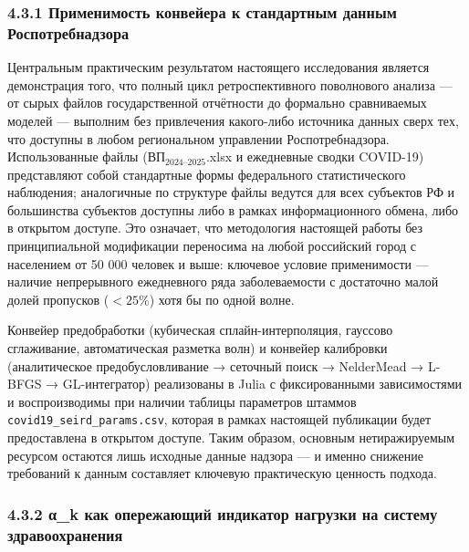 \documentclass[12pt]{article}
\begin{document}
\subsubsection{4.3.1 Применимость конвейера к стандартным данным
Роспотребнадзора}\label{ux43fux440ux438ux43cux435ux43dux438ux43cux43eux441ux442ux44c-ux43aux43eux43dux432ux435ux439ux435ux440ux430-ux43a-ux441ux442ux430ux43dux434ux430ux440ux442ux43dux44bux43c-ux434ux430ux43dux43dux44bux43c-ux440ux43eux441ux43fux43eux442ux440ux435ux431ux43dux430ux434ux437ux43eux440ux430}

Центральным практическим результатом настоящего исследования является
демонстрация того, что полный цикл ретроспективного поволнового анализа
--- от сырых файлов государственной отчётности до формально сравниваемых
моделей --- выполним без привлечения какого-либо источника данных сверх
тех, что доступны в любом региональном управлении Роспотребнадзора.
Использованные файлы (\(\text{ВП}_{2024\text{–}2025}\).xlsx и ежедневные
сводки COVID-19) представляют собой стандартные формы федерального
статистического наблюдения; аналогичные по структуре файлы ведутся для
всех субъектов РФ и большинства субъектов доступны либо в рамках
информационного обмена, либо в открытом доступе. Это означает, что
методология настоящей работы без принципиальной модификации переносима
на любой российский город с населением от 50 000 человек и выше:
ключевое условие применимости --- наличие непрерывного ежедневного ряда
заболеваемости с достаточно малой долей пропусков (\(< 25\)\%) хотя бы
по одной волне.

Конвейер предобработки (кубическая сплайн-интерполяция, гауссово
сглаживание, автоматическая разметка волн) и конвейер калибровки
(аналитическое предобусловливание → сеточный поиск → NelderMead → L-BFGS
→ GL-интегратор) реализованы в Julia с фиксированными зависимостями и
воспроизводимы при наличии таблицы параметров штаммов
\texttt{covid19\_seird\_params.csv}, которая в рамках настоящей
публикации будет предоставлена в открытом доступе. Таким образом,
основным нетиражируемым ресурсом остаются лишь исходные данные надзора
--- и именно снижение требований к данным составляет ключевую
практическую ценность подхода.

\subsubsection{4.3.2 α\_k как опережающий индикатор нагрузки на систему
здравоохранения}\label{ux3b1_k-ux43aux430ux43a-ux43eux43fux435ux440ux435ux436ux430ux44eux449ux438ux439-ux438ux43dux434ux438ux43aux430ux442ux43eux440-ux43dux430ux433ux440ux443ux437ux43aux438-ux43dux430-ux441ux438ux441ux442ux435ux43cux443-ux437ux434ux440ux430ux432ux43eux43eux445ux440ux430ux43dux435ux43dux438ux44f}
\end{document}
